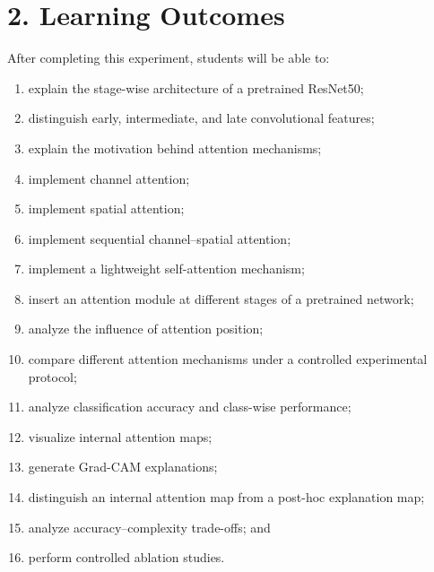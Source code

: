 \documentclass[10pt]{article}
\begin{document}
\section*{2. Learning Outcomes}

After completing this experiment, students will be able to:

\begin{enumerate}

\item explain the stage-wise architecture of a pretrained ResNet50;

\item distinguish early, intermediate, and late convolutional features;

\item explain the motivation behind attention mechanisms;

\item implement channel attention;

\item implement spatial attention;

\item implement sequential channel--spatial attention;

\item implement a lightweight self-attention mechanism;

\item insert an attention module at different stages of a pretrained network;

\item analyze the influence of attention position;

\item compare different attention mechanisms under a controlled experimental
protocol;

\item analyze classification accuracy and class-wise performance;

\item visualize internal attention maps;

\item generate Grad-CAM explanations;

\item distinguish an internal attention map from a post-hoc explanation map;

\item analyze accuracy--complexity trade-offs; and

\item perform controlled ablation studies.

\end{enumerate}
\end{document}
